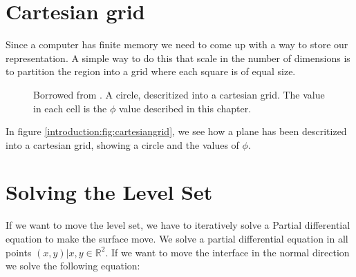 \section*{Cartesian grid}

Since a computer has finite memory we need to come up with a way to
store our representation. A simple way to do this that scale in the
number of dimensions is to partition the region into a grid where each
square is of equal size.

\begin{figure}[htb] \centering
  \caption{Borrowed from . A circle, descritized into a
cartesian grid. The value in each cell is the $\phi$ value described
in this chapter.}
  \label{introduction:fig:cartesiangrid}
\end{figure}

In figure \vref{introduction:fig:cartesiangrid}, we see how a plane
has been descritized into a cartesian grid, showing a circle and the
values of $\phi$.


\section*{Solving the Level Set}\label{sec:intro:solve} 


If we want to move the level set, we have to iteratively solve a Partial
differential equation to make the surface move. We solve a partial
differential equation in all points $(x,y) | x,y \in
\mathbb{R}^{2}$. If we want to move the interface in the normal
direction we solve the following equation:

